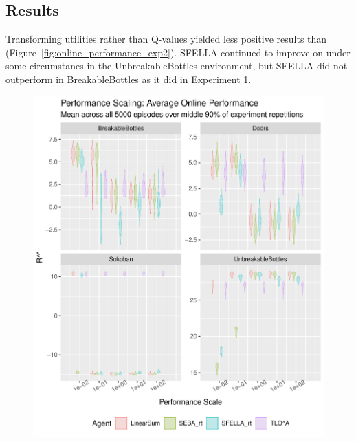 \subsection{Results}

Transforming utilities rather than Q-values yielded less positive results than \tloA{} (Figure~\ref{fig:online_performance_exp2}). SFELLA continued to improve on \tloA{} under some circumstanes in the UnbreakableBottles environment, but SFELLA did not outperform \tloA{} in BreakableBottles as it did in Experiment 1. 

\begin{figure}
  \includegraphics[width=\columnwidth]{output/multirun_n100_reward_to_util_transformonline_util_transform_Performance.pdf}

\end{figure}
